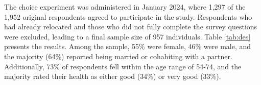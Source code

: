 \documentclass[3p,11pt ]{elsarticle}
\begin{document}




The choice experiment was administered in January 2024,
where 1,297 of the 1,952 original respondents agreed to participate in the study.
Respondents who had already relocated and those who did not fully complete the survey questions were excluded, leading to a final sample size of 957 individuals.
Table \ref{tab:des} presents the results.
Among the sample, 55\% were female, 46\% were male, and the majority (64\%) reported being married or cohabiting with a partner. Additionally, 73\% of respondents fell within the age range of 54-74, and the majority rated their health as either good (34\%) or very good (33\%).

\begin{table}




\end{table}

\clearpage

%
%
%
\end{document}
